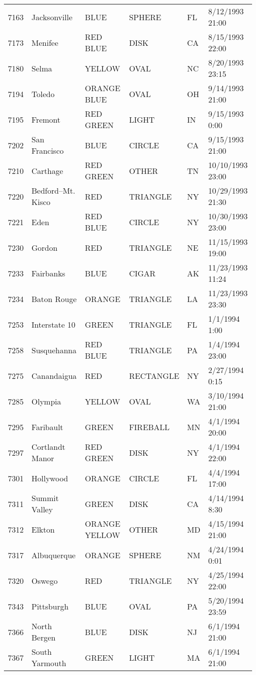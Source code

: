 \begin{tabular}{llllll}
7163 & Jacksonville & BLUE & SPHERE & FL & 8/12/1993 21:00 \\
7173 & Menifee & RED BLUE & DISK & CA & 8/15/1993 22:00 \\
7180 & Selma & YELLOW & OVAL & NC & 8/20/1993 23:15 \\
7194 & Toledo & ORANGE BLUE & OVAL & OH & 9/14/1993 21:00 \\
7195 & Fremont & RED GREEN & LIGHT & IN & 9/15/1993 0:00 \\
7202 & San Francisco & BLUE & CIRCLE & CA & 9/15/1993 21:00 \\
7210 & Carthage & RED GREEN & OTHER & TN & 10/10/1993 23:00 \\
7220 & Bedford--Mt. Kisco & RED & TRIANGLE & NY & 10/29/1993 21:30 \\
7221 & Eden & RED BLUE & CIRCLE & NY & 10/30/1993 23:00 \\
7230 & Gordon & RED & TRIANGLE & NE & 11/15/1993 19:00 \\
7233 & Fairbanks & BLUE & CIGAR & AK & 11/23/1993 11:24 \\
7234 & Baton Rouge & ORANGE & TRIANGLE & LA & 11/23/1993 23:30 \\
7253 & Interstate 10 & GREEN & TRIANGLE & FL & 1/1/1994 1:00 \\
7258 & Susquehanna & RED BLUE & TRIANGLE & PA & 1/4/1994 23:00 \\
7275 & Canandaigua & RED & RECTANGLE & NY & 2/27/1994 0:15 \\
7285 & Olympia & YELLOW & OVAL & WA & 3/10/1994 21:00 \\
7295 & Faribault & GREEN & FIREBALL & MN & 4/1/1994 20:00 \\
7297 & Cortlandt Manor & RED GREEN & DISK & NY & 4/1/1994 22:00 \\
7301 & Hollywood & ORANGE & CIRCLE & FL & 4/4/1994 17:00 \\
7311 & Summit Valley & GREEN & DISK & CA & 4/14/1994 8:30 \\
7312 & Elkton & ORANGE YELLOW & OTHER & MD & 4/15/1994 21:00 \\
7317 & Albuquerque & ORANGE & SPHERE & NM & 4/24/1994 0:01 \\
7320 & Oswego & RED & TRIANGLE & NY & 4/25/1994 22:00 \\
7343 & Pittsburgh & BLUE & OVAL & PA & 5/20/1994 23:59 \\
7366 & North Bergen & BLUE & DISK & NJ & 6/1/1994 21:00 \\
7367 & South Yarmouth & GREEN & LIGHT & MA & 6/1/1994 21:00 \\

\end{tabular}
